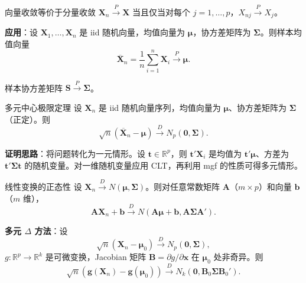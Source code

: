 \begin{theorem}{向量收敛等价于分量收敛}\label{th:vector-component-wise}
$\mathbf{X}_n \xrightarrow{P} \mathbf{X}$ 当且仅当对每个 $j = 1, \ldots, p$，$X_{nj} \xrightarrow{P} X_j$。
\end{theorem}

\textbf{应用}：设 $\mathbf{X}_1, \ldots, \mathbf{X}_n$ 是 iid 随机向量，均值向量为 $\boldsymbol{\mu}$，协方差矩阵为 $\boldsymbol{\Sigma}$。则样本均值向量
\[
\overline{\mathbf{X}}_n = \frac{1}{n}\sum_{i=1}^n \mathbf{X}_i \xrightarrow{P} \boldsymbol{\mu}.
\label{eq:sample-mean-vector}
\]

样本协方差矩阵 $\mathbf{S} \xrightarrow{P} \boldsymbol{\Sigma}$。

\begin{example}{多元中心极限定理}\label{th:multivariate-clt}
设 ${\mathbf{X}_n}$ 是 iid 随机向量序列，均值向量为 $\boldsymbol{\mu}$、协方差矩阵为 $\boldsymbol{\Sigma}$（正定）。则
\[
\sqrt{n}(\overline{\mathbf{X}}_n - \boldsymbol{\mu}) \xrightarrow{D} N_p(\mathbf{0}, \boldsymbol{\Sigma}).
\label{eq:multivariate-clt}
\]
\end{example}

\textbf{证明思路}：将问题转化为一元情形。设 $\mathbf{t} \in \mathbb{R}^p$，则 $\mathbf{t}'\mathbf{X}_i$ 是均值为 $\mathbf{t}'\boldsymbol{\mu}$、方差为 $\mathbf{t}'\boldsymbol{\Sigma}\mathbf{t}$ 的随机变量。对一维随机变量应用 CLT，再利用 mgf 的性质可得多元情形。%

\begin{example}{线性变换的正态性}\label{th:linear-transformation}
设 $\mathbf{X}_n \xrightarrow{D} N(\boldsymbol{\mu}, \boldsymbol{\Sigma})$。则对任意常数矩阵 $\mathbf{A}$（$m \times p$）和向量 $\mathbf{b}$（$m$ 维），
\[
\mathbf{A}\mathbf{X}_n + \mathbf{b} \xrightarrow{D} N(\mathbf{A}\boldsymbol{\mu} + \mathbf{b}, \mathbf{A}\boldsymbol{\Sigma}\mathbf{A}').
\label{eq:linear-normal}
\]
\end{example}

\textbf{多元 $\Delta$ 方法}：设
\[
\sqrt{n}(\mathbf{X}_n - \boldsymbol{\mu}_0) \xrightarrow{D} N_p(\mathbf{0}, \boldsymbol{\Sigma}),
\]
$g: \mathbb{R}^p \to \mathbb{R}^k$ 是可微变换，Jacobian 矩阵 $\mathbf{B} = \partial g / \partial \mathbf{x}$ 在 $\boldsymbol{\mu}_0$ 处非奇异。则
\[
\sqrt{n}(\mathbf{g}(\mathbf{X}_n) - \mathbf{g}(\boldsymbol{\mu}_0)) \xrightarrow{D} N_k(\mathbf{0}, \mathbf{B}_0\boldsymbol{\Sigma}\mathbf{B}_0').
\label{eq:multivariate-delta-method}
\]

